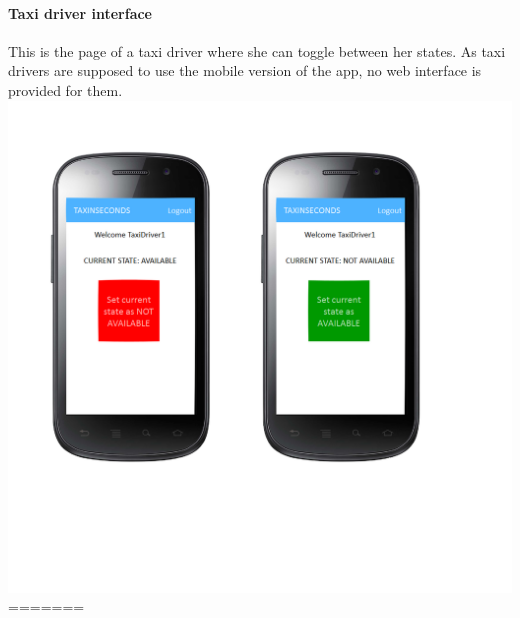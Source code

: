 \documentclass{article}
\begin{document}
\paragraph{Taxi driver interface} 
This is the page of a taxi driver where she can toggle between her states. As taxi drivers are supposed to use the mobile version of the app, no web interface is provided for them.
\includegraphics{Taxi driver interface}
=======
\end{document}
